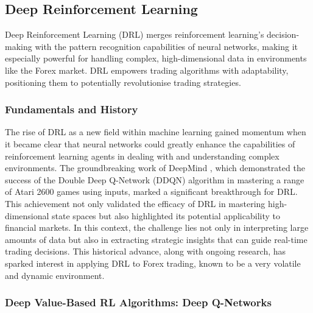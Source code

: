\subsection{Deep Reinforcement Learning}

Deep Reinforcement Learning (DRL) merges reinforcement learning's decision-making with the pattern recognition capabilities of neural networks, making it especially powerful for handling complex, high-dimensional data in environments like the Forex market. DRL empowers trading algorithms with adaptability, positioning them to potentially revolutionise trading strategies.

\subsubsection{Fundamentals and History}

The rise of DRL as a new field within machine learning gained momentum when it became clear that neural networks could greatly enhance the capabilities of reinforcement learning agents in dealing with and understanding complex environments. The groundbreaking work of DeepMind \cite{van_hasselt_deep_2016}, which demonstrated the success of the Double Deep Q-Network (DDQN) algorithm in mastering a range of Atari 2600 games using inputs, marked a significant breakthrough for DRL. This achievement not only validated the efficacy of DRL in mastering high-dimensional state spaces but also highlighted its potential applicability to financial markets. In this context, the challenge lies not only in interpreting large amounts of data but also in extracting strategic insights that can guide real-time trading decisions. This historical advance, along with ongoing research, has sparked interest in applying DRL to Forex trading, known to be a very volatile and dynamic environment.

\subsubsection{Deep Value-Based RL Algorithms: Deep Q-Networks}

